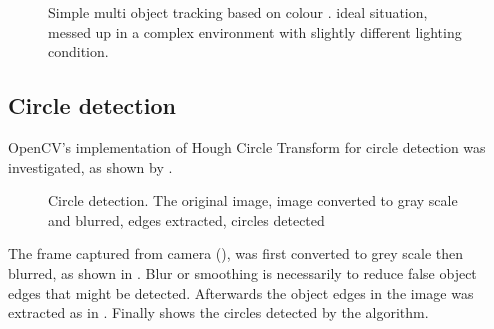 \begin{figure}[H]
  \centering
  \caption{Simple multi object tracking based on colour \cite{MOTBOC.git}.  ideal situation,  messed up in a complex environment with slightly different lighting condition.}
  \label{imp:MOTBOC}
\end{figure}


\subsection{Circle detection}

OpenCV's implementation of Hough Circle Transform for circle detection was investigated, as shown by .


\begin{figure}[H]
  \centering
  \caption{Circle detection.  The original image,  image converted to gray scale and blurred,  edges extracted,  circles detected}
  \label{Figure:circles}
\end{figure}

The frame captured from camera (), was first converted to grey scale then blurred, as shown in . Blur or smoothing is necessarily to reduce false object edges that might be detected. Afterwards the object edges in the image was extracted as in . Finally  shows the circles detected by the algorithm.

